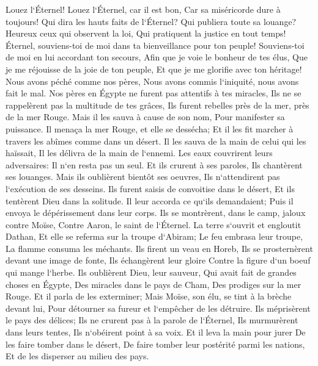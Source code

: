 \verse Louez l`Éternel! Louez l`Éternel, car il est bon, Car sa miséricorde dure à toujours! 
\verse Qui dira les hauts faits de l`Éternel? Qui publiera toute sa louange? 
\verse Heureux ceux qui observent la loi, Qui pratiquent la justice en tout temps! 
\verse Éternel, souviens-toi de moi dans ta bienveillance pour ton peuple! Souviens-toi de moi en lui accordant ton secours, 
\verse Afin que je voie le bonheur de tes élus, Que je me réjouisse de la joie de ton peuple, Et que je me glorifie avec ton héritage! 
\verse Nous avons péché comme nos pères, Nous avons commis l`iniquité, nous avons fait le mal. 
\verse Nos pères en Égypte ne furent pas attentifs à tes miracles, Ils ne se rappelèrent pas la multitude de tes grâces, Ils furent rebelles près de la mer, près de la mer Rouge. 
\verse Mais il les sauva à cause de son nom, Pour manifester sa puissance. 
\verse Il menaça la mer Rouge, et elle se dessécha; Et il les fit marcher à travers les abîmes comme dans un désert. 
\verse Il les sauva de la main de celui qui les haïssait, Il les délivra de la main de l`ennemi. 
\verse Les eaux couvrirent leurs adversaires: Il n`en resta pas un seul. 
\verse Et ils crurent à ses paroles, Ils chantèrent ses louanges. 
\verse Mais ils oublièrent bientôt ses oeuvres, Ils n`attendirent pas l`exécution de ses desseins. 
\verse Ils furent saisis de convoitise dans le désert, Et ils tentèrent Dieu dans la solitude. 
\verse Il leur accorda ce qu`ils demandaient; Puis il envoya le dépérissement dans leur corps. 
\verse Ils se montrèrent, dans le camp, jaloux contre Moïse, Contre Aaron, le saint de l`Éternel. 
\verse La terre s`ouvrit et engloutit Dathan, Et elle se referma sur la troupe d`Abiram; 
\verse Le feu embrasa leur troupe, La flamme consuma les méchants. 
\verse Ils firent un veau en Horeb, Ils se prosternèrent devant une image de fonte, 
\verse Ils échangèrent leur gloire Contre la figure d`un boeuf qui mange l`herbe. 
\verse Ils oublièrent Dieu, leur sauveur, Qui avait fait de grandes choses en Égypte, 
\verse Des miracles dans le pays de Cham, Des prodiges sur la mer Rouge. 
\verse Et il parla de les exterminer; Mais Moïse, son élu, se tint à la brèche devant lui, Pour détourner sa fureur et l`empêcher de les détruire. 
\verse Ils méprisèrent le pays des délices; Ils ne crurent pas à la parole de l`Éternel, 
\verse Ils murmurèrent dans leurs tentes, Ils n`obéirent point à sa voix. 
\verse Et il leva la main pour jurer De les faire tomber dans le désert, 
\verse De faire tomber leur postérité parmi les nations, Et de les disperser au milieu des pays. 
